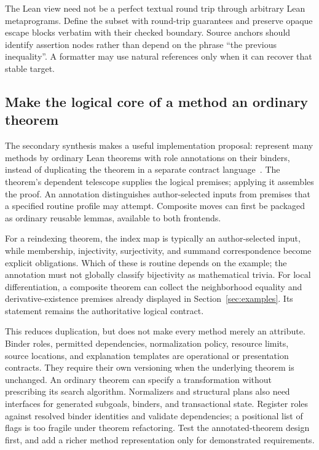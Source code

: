 \documentclass[11pt,letterpaper]{article}
\begin{document}
The Lean view need not be a perfect textual round trip through arbitrary Lean
metaprograms. Define the subset with round-trip guarantees and preserve opaque
escape blocks verbatim with their checked boundary. Source anchors should identify
assertion nodes rather than depend on the phrase ``the previous inequality''.
A formatter may use natural references only when it can recover that stable target.

\subsection{Make the logical core of a method an ordinary theorem}\label{sec:annotated}
The secondary synthesis makes a useful implementation proposal: represent many
methods by ordinary Lean theorems with role annotations on their binders, instead
of duplicating the theorem in a separate contract language~\cite[\S7.1]{secondary}.
The theorem's dependent telescope supplies the logical premises; applying it
assembles the proof. An annotation distinguishes author-selected inputs from
premises that a specified routine profile may attempt. Composite moves can first
be packaged as ordinary reusable lemmas, available to both frontends.

For a reindexing theorem, the index map is typically an author-selected input,
while membership, injectivity, surjectivity, and summand correspondence become
explicit obligations. Which of these is routine depends on the example; the
annotation must not globally classify bijectivity as mathematical trivia. For
local differentiation, a composite theorem can collect the neighborhood equality
and derivative-existence premises already displayed in Section~\ref{sec:examples}.
Its statement remains the authoritative logical contract.

This reduces duplication, but does not make every method merely an attribute.
Binder roles, permitted dependencies, normalization policy, resource limits, source
locations, and explanation templates are operational or presentation contracts.
They require their own versioning when the underlying theorem is unchanged.
An ordinary theorem can specify a transformation without prescribing its search
algorithm. Normalizers and structural plans also need interfaces for generated
subgoals, binders, and transactional state. Register roles against resolved binder
identities and validate dependencies; a positional list of flags is too fragile
under theorem refactoring. Test the annotated-theorem design first, and add a
richer method representation only for demonstrated requirements.
\end{document}

